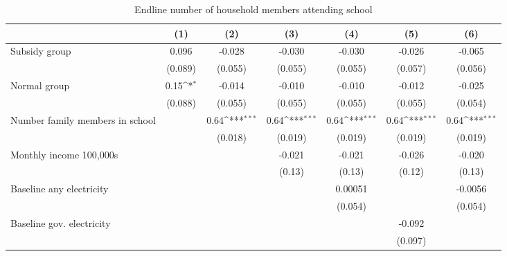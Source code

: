 \begin{table}[htbp]\centering
\def\sym#1{\ifmmode^{#1}\else\(^{#1}\)\fi}
\caption{Endline number of household members attending school}
\begin{tabular*}{1\hsize}{@{\hskip\tabcolsep\extracolsep\fill}l*{6}{c}}
\toprule
                &\multicolumn{1}{c}{(1)}         &\multicolumn{1}{c}{(2)}         &\multicolumn{1}{c}{(3)}         &\multicolumn{1}{c}{(4)}         &\multicolumn{1}{c}{(5)}         &\multicolumn{1}{c}{(6)}         \\
\midrule
Subsidy group   &    0.096         &   -0.028         &   -0.030         &   -0.030         &   -0.026         &   -0.065         \\
                &  (0.089)         &  (0.055)         &  (0.055)         &  (0.055)         &  (0.057)         &  (0.056)         \\
Normal group    &     0.15\sym{*}  &   -0.014         &   -0.010         &   -0.010         &   -0.012         &   -0.025         \\
                &  (0.088)         &  (0.055)         &  (0.055)         &  (0.055)         &  (0.055)         &  (0.054)         \\
Number family members in school&                  &     0.64\sym{***}&     0.64\sym{***}&     0.64\sym{***}&     0.64\sym{***}&     0.64\sym{***}\\
                &                  &  (0.018)         &  (0.019)         &  (0.019)         &  (0.019)         &  (0.019)         \\
Monthly income 100,000s&                  &                  &   -0.021         &   -0.021         &   -0.026         &   -0.020         \\
                &                  &                  &   (0.13)         &   (0.13)         &   (0.12)         &   (0.13)         \\
Baseline any electricity&                  &                  &                  &  0.00051         &                  &  -0.0056         \\
                &                  &                  &                  &  (0.054)         &                  &  (0.054)         \\
Baseline gov. electricity&                  &                  &                  &                  &   -0.092         &                  \\
                &                  &                  &                  &                  &  (0.097)         &                  \\

\end{tabular*}
\end{table}
